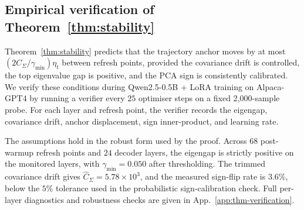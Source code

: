 \begin{center}
\end{center}

\subsection{Empirical verification of Theorem~\ref{thm:stability}}
\label{sec:thm-empirical}

Theorem~\ref{thm:stability} predicts that the trajectory anchor
moves by at most $(2C_\Sigma/\gamma_{\min})\eta_t$ between refresh
points, provided the covariance drift is controlled, the top
eigenvalue gap is positive, and the PCA sign is consistently
calibrated. We verify these conditions during Qwen2.5-0.5B + LoRA
training on Alpaca-GPT4 by running a verifier every $25$ optimiser
steps on a fixed 2{,}000-sample probe. For each layer and refresh
point, the verifier records the eigengap, covariance drift, anchor
displacement, sign inner-product, and learning rate.

The assumptions hold in the robust form used by the proof. Across
$68$ post-warmup refresh points and $24$ decoder layers, the
eigengap is strictly positive on the monitored layers, with
$\gamma_{\min}=0.050$ after thresholding. The trimmed covariance
drift gives $\hat{C}_\Sigma=5.78\times 10^3$, and the measured
sign-flip rate is $3.6\%$, below the $5\%$ tolerance used in the
probabilistic sign-calibration check. Full per-layer diagnostics
and robustness checks are given in App.~\ref{app:thm-verification}.

